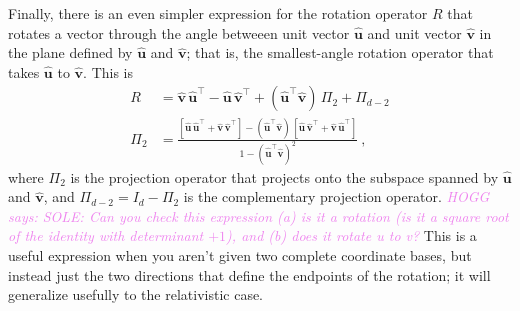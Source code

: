 \documentclass{article}
\newcommand{\proj}{\mathsf{\Pi}}
\newcommand{\Ehat}[1]{{\mathbf{\hat{#1}}}} %
\newcommand{\HOGG}[1]{\textcolor{violet}{\textsl{HOGG says: {#1}}}}
\begin{document}
Finally, there is an even simpler expression for the rotation operator $R$ that rotates a vector through the angle betweeen unit vector $\Ehat{u}$ and unit vector $\Ehat{v}$ in the plane defined by $\Ehat{u}$ and $\Ehat{v}$; that is, the smallest-angle rotation operator that takes $\Ehat{u}$ to $\Ehat{v}$.
This is
\begin{align}
    R &= \Ehat{v}\,\Ehat{u}^\top - \Ehat{u}\,\Ehat{v}^\top + (\Ehat{u}^\top\Ehat{v})\,\proj_{2} + \proj_{d-2} \label{eq:vecs2rot} \\
    \proj_2 &= \frac{[\Ehat{u}\,\Ehat{u}^\top + \Ehat{v}\,\Ehat{v}^\top] - (\Ehat{u}^\top\Ehat{v})\,[\Ehat{u}\,\Ehat{v}^\top + \Ehat{v}\,\Ehat{u}^\top]}{1 - (\Ehat{u}^\top\Ehat{v})^2} ~,
\end{align}
where $\proj_2$ is the projection operator that projects onto the subspace spanned by $\Ehat{u}$ and $\Ehat{v}$, and $\proj_{d-2} = I_d - \proj_2$ is the complementary projection operator.
\HOGG{SOLE: Can you check this expression (a) is it a rotation (is it a square root of the identity with determinant $+1$), and (b) does it rotate u to v?}
This is a useful expression when you aren't given two complete coordinate bases, but instead just the two directions that define the endpoints of the rotation; it will generalize usefully to the relativistic case.
\end{document}
